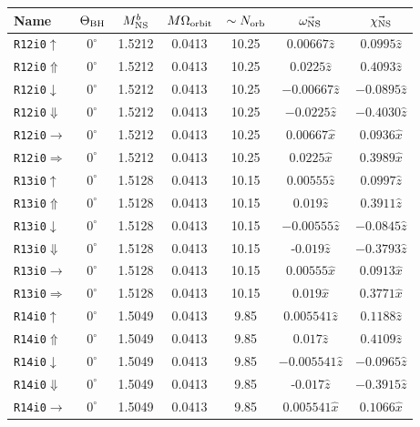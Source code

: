 \begin{longtable}{l|c|c|c|c|c|c}
\centering
Name & $\Theta_{\rm BH}$ & $M^b_{\rm NS}$ & $M\Omega_{\rm orbit}$ & $\sim N_{\rm orb}$ & $\vec{\omega_{\rm NS}}$ & $\vec{\chi_{\rm NS}}$  
\\\hline
{\tt R12i0$\uparrow$}&$0^\circ$ & 1.5212 & 0.0413 & 10.25 & $0.00667\hat{z}$ & $0.0995\hat{z}$ \\
{\tt R12i0$\Uparrow$}&$0^\circ$ & 1.5212 & 0.0413 & 10.25 & $0.0225\hat{z}$ & $0.4093\hat{z}$ \\
{\tt R12i0$\downarrow$}&$0^\circ$ & 1.5212 & 0.0413 & 10.25 & $-0.00667\hat{z}$& $-0.0895\hat{z}$\\
{\tt R12i0$\Downarrow$}&$0^\circ$ & 1.5212 & 0.0413 & 10.25 & $-0.0225\hat{z}$ & $-0.4030\hat{z}$ \\
{\tt R12i0$\rightarrow$}&$0^\circ$ & 1.5212 & 0.0413 & 10.25 & $0.00667\hat{x}$ & $0.0936\hat{x}$\\
{\tt R12i0$\Rightarrow$}&$0^\circ$ & 1.5212 & 0.0413 & 10.25 & $0.0225\hat{x}$ & $0.3989\hat{x}$ \\
\hline
{\tt R13i0$\uparrow$}&$0^\circ$ & 1.5128 & 0.0413  & 10.15 & $0.00555\hat{z}$ & $0.0997\hat{z}$ \\
{\tt R13i0$\Uparrow$}&$0^\circ$ & 1.5128 & 0.0413 & 10.15 & $0.019\hat{z}$ & $0.3911\hat{z}$ \\
{\tt R13i0$\downarrow$}&$0^\circ$ & 1.5128 & 0.0413 & 10.15 & $-0.00555\hat{z}$& $-0.0845\hat{z}$\\
{\tt R13i0$\Downarrow$}&$0^\circ$ & 1.5128 & 0.0413 & 10.15 & -$0.019\hat{z}$ & $-0.3793\hat{z}$ \\
{\tt R13i0$\rightarrow$}&$0^\circ$ & 1.5128 & 0.0413 & 10.15 & $0.00555\hat{x}$ & $0.0913\hat{x}$\\
{\tt R13i0$\Rightarrow$}&$0^\circ$ & 1.5128 & 0.0413 & 10.15 & $0.019\hat{x}$ & $0.3771\hat{x}$ \\
\hline
{\tt R14i0$\uparrow$}&$0^\circ$ & 1.5049 & 0.0413 & 9.85 & $0.005541\hat{z}$ & $0.1188\hat{z}$ \\
{\tt R14i0$\Uparrow$}&$0^\circ$ & 1.5049 & 0.0413 & 9.85 & $0.017\hat{z}$ & $0.4109\hat{z}$ \\
{\tt R14i0$\downarrow$}&$0^\circ$ & 1.5049 & 0.0413 & 9.85 & $-0.005541\hat{z}$& $-0.0965\hat{z}$\\
{\tt R14i0$\Downarrow$}&$0^\circ$ & 1.5049 & 0.0413 & 9.85 & -$0.017\hat{z}$ & $-0.3915\hat{z}$\\
{\tt R14i0$\rightarrow$}&$0^\circ$ & 1.5049 & 0.0413 & 9.85 & $0.005541\hat{x}$ & $0.1066\hat{x}$\\

\end{longtable}
